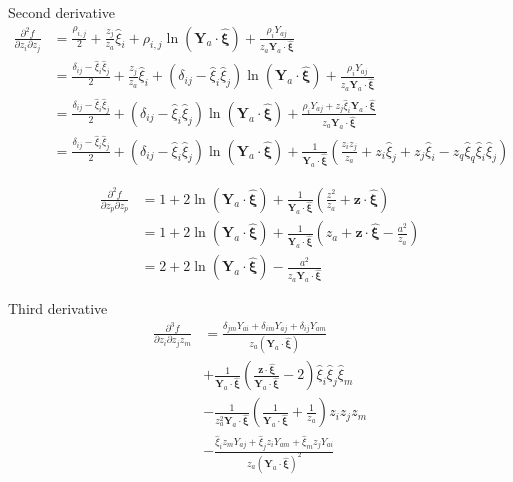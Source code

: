 \documentclass[10pt]{report}
\begin{document}
{Second derivative
\begin{align}
\frac{\partial^2 f}{\partial  z_i\partial  z_j}
&=
\frac{\rho_{i,j}}{2}
+\frac{z_j}{z_a}\hat{\xi}_i
+ \rho_{i,j}\ln\left(\bm Y_a \cdot \hat{\bm \xi}\right)
+ \frac{\rho_iY_{aj}}{z_a \bm Y_a \cdot \hat{\bm \xi}}\nonumber\\
%
&=
\frac{ \delta_{ij}-\hat{\xi}_i\hat{\xi}_j}{2}
+\frac{z_j}{z_a}\hat{\xi}_i
+ (\delta_{ij}-\hat{\xi}_i\hat{\xi}_j)\ln\left(\bm Y_a \cdot \hat{\bm \xi}\right)
+ \frac{\rho_iY_{aj}}{z_a \bm Y_a \cdot \hat{\bm \xi}}\nonumber\\
&=
\frac{ \delta_{ij}-\hat{\xi}_i\hat{\xi}_j}{2}
+ (\delta_{ij}-\hat{\xi}_i\hat{\xi}_j)\ln\left(\bm Y_a \cdot \hat{\bm \xi}\right)
+ \frac{\rho_iY_{aj}+z_j\hat{\xi}_i \bm Y_a \cdot \hat{\bm \xi}}{z_a \bm Y_a \cdot \hat{\bm \xi}}
\nonumber\\
&=
\frac{ \delta_{ij}-\hat{\xi}_i\hat{\xi}_j}{2}
+ (\delta_{ij}-\hat{\xi}_i\hat{\xi}_j)\ln\left(\bm Y_a \cdot \hat{\bm \xi}\right)
+ \frac{1}{ \bm Y_a \cdot \hat{\bm \xi}}\left(\frac{z_iz_j}{z_a}+z_i\hat{\xi}_j+z_j\hat{\xi}_i-z_q\hat{\xi}_q\hat{\xi}_i\hat{\xi}_j\right)
\end{align}

\begin{align}
\frac{\partial^2 f}{\partial  z_p\partial  z_p}
&=1+ 2\ln\left(\bm Y_a \cdot \hat{\bm \xi}\right)+ \frac{1}{ \bm Y_a \cdot \hat{\bm \xi}}\left(\frac{z^2}{z_a}+\bm z\cdot\hat{\bm\xi}\right)\nonumber\\
&=1+ 2\ln\left(\bm Y_a \cdot \hat{\bm \xi}\right)+ \frac{1}{ \bm Y_a \cdot \hat{\bm \xi}}\left(z_a+\bm z\cdot\hat{\bm\xi}-\frac{a^2}{z_a}\right)\nonumber\\
&=2+ 2\ln\left(\bm Y_a \cdot \hat{\bm \xi}\right)-\frac{a^2}{z_a \bm Y_a \cdot \hat{\bm \xi}}
\label{laplacianFz}
\end{align}

Third derivative
\begin{align}
\frac{\partial^3 f}{\partial  z_i\partial  z_j z_m}
&=\frac{\delta_{jm}Y_{ai}+\delta_{im}Y_{aj}+\delta_{ij}Y_{am}}{z_a(\bm Y_a\cdot \hat{\bm \xi})}\\
&+\frac{1}{\bm Y_a\cdot \hat{\bm \xi}}\left(\frac{\bm z\cdot{\hat{\bm \xi}}}{\bm Y_a\cdot \hat{\bm \xi}}-2\right)\hat{\xi}_i\hat{\xi}_j\hat{\xi}_m\\
&-\frac{1}{z_a^2\bm Y_a\cdot \hat{\bm \xi}}\left(\frac{1}{\bm Y_a\cdot \hat{\bm \xi}}+\frac{1}{z_a}\right)z_iz_jz_m\\
&-\frac{\hat{\xi}_iz_mY_{aj}+\hat{\xi}_jz_iY_{am}+\hat{\xi}_mz_jY_{ai}}{z_a(\bm Y_a\cdot \hat{\bm \xi})^2}\\
\end{align}

}
\end{document}
